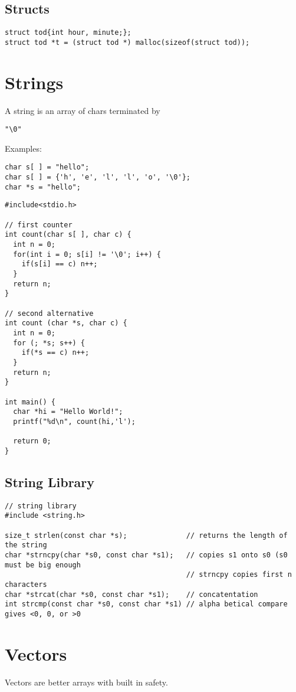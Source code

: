 \documentclass[12pt]{article}
\begin{document}
\subsection*{Structs}
\begin{verbatim}
struct tod{int hour, minute;};
struct tod *t = (struct tod *) malloc(sizeof(struct tod));
\end{verbatim}

\section*{Strings}
A string is an array of chars terminated by \begin{verbatim}"\0"\end{verbatim}

Examples:
\begin{verbatim}
char s[ ] = "hello";
char s[ ] = {'h', 'e', 'l', 'l', 'o', '\0'};
char *s = "hello";
\end{verbatim}

\begin{verbatim}
#include<stdio.h>

// first counter
int count(char s[ ], char c) {
  int n = 0;
  for(int i = 0; s[i] != '\0'; i++) {
    if(s[i] == c) n++;
  }
  return n;
}

// second alternative
int count (char *s, char c) {
  int n = 0;
  for (; *s; s++) {
    if(*s == c) n++;
  }
  return n;
}

int main() {
  char *hi = "Hello World!";
  printf("%d\n", count(hi,'l');

  return 0;
}
\end{verbatim}

\subsection*{String Library}
\begin{verbatim}
// string library
#include <string.h>

size_t strlen(const char *s);              // returns the length of the string
char *strncpy(char *s0, const char *s1);   // copies s1 onto s0 (s0 must be big enough
                                           // strncpy copies first n characters
char *strcat(char *s0, const char *s1);    // concatentation
int strcmp(const char *s0, const char *s1) // alpha betical compare gives <0, 0, or >0
\end{verbatim}

\section*{Vectors}
Vectors are better arrays with built in safety.
\end{document}
